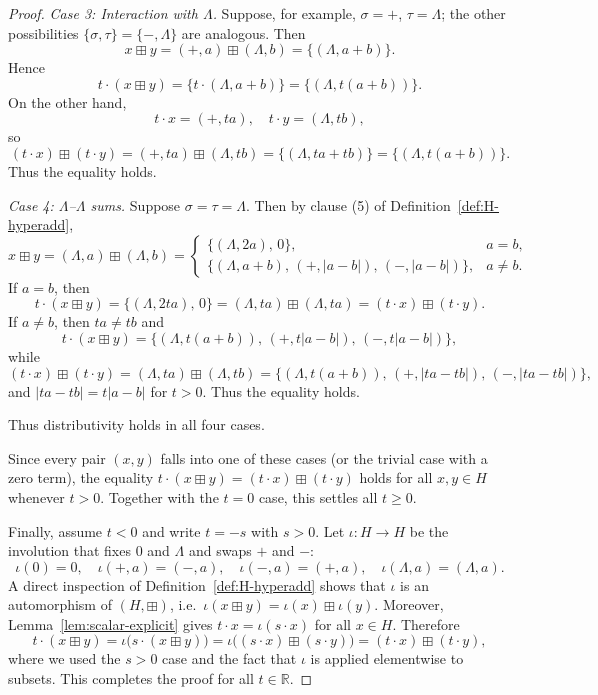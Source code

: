 \documentclass[11pt]{amsart}
\numberwithin{equation}{section}
\theoremstyle{definition}
\theoremstyle{remark}
\newcommand{\R}{\mathbb{R}}
\newcommand{\Hnum}{H}                      %
\newcommand{\op}{\boxplus}                 %
\begin{document}
\begin{proof}
\smallskip\noindent
\emph{Case 3: Interaction with $\Lambda$.}  Suppose, for example,
$\sigma=+$, $\tau=\Lambda$; the other possibilities
$\{\sigma,\tau\}=\{-,\Lambda\}$ are analogous.  Then
\[
  x\op y
  = (+,a)\op(\Lambda,b)
  = \{(\Lambda,a+b)\}.
\]
Hence
\[
  t\cdot(x\op y)
  = \{t\cdot(\Lambda,a+b)\}
  = \{(\Lambda,t(a+b))\}.
\]
On the other hand,
\[
  t\cdot x = (+,ta),\quad
  t\cdot y = (\Lambda,tb),
\]
so
\[
  (t\cdot x)\op(t\cdot y)
  = (+,ta)\op(\Lambda,tb)
  = \{(\Lambda,ta+tb)\}
  = \{(\Lambda,t(a+b))\}.
\]
Thus the equality holds.

\smallskip\noindent
\smallskip\noindent
\emph{Case 4: $\Lambda$--$\Lambda$ sums.}  Suppose $\sigma=\tau=\Lambda$.
Then by clause (5) of Definition~\ref{def:H-hyperadd},
\[
  x\op y
  = (\Lambda,a)\op(\Lambda,b)
  =
  \begin{cases}
    \{(\Lambda,2a),\,0\}, & a=b,\\[2pt]
    \{(\Lambda,a+b),\, (+,|a-b|),\, (-,|a-b|)\}, & a\ne b.
  \end{cases}
\]
If $a=b$, then
\[
  t\cdot(x\op y)
  = \{(\Lambda,2ta),\,0\}
  = (\Lambda,ta)\op(\Lambda,ta)
  = (t\cdot x)\op(t\cdot y).
\]
If $a\ne b$, then $ta\ne tb$ and
\[
  t\cdot(x\op y)
  = \{(\Lambda,t(a+b)),\, (+,t|a-b|),\, (-,t|a-b|)\},
\]
while
\[
  (t\cdot x)\op(t\cdot y)
  = (\Lambda,ta)\op(\Lambda,tb)
  = \{(\Lambda,t(a+b)),\, (+,|ta-tb|),\, (-,|ta-tb|)\},
\]
and $|ta-tb|=t|a-b|$ for $t>0$.  Thus the equality holds.

Thus distributivity holds in all four cases.

Since every pair $(x,y)$ falls into one of these cases (or the trivial
case with a zero term), the equality
$t\cdot(x\op y)=(t\cdot x)\op(t\cdot y)$ holds for all $x,y\in\Hnum$
whenever $t>0$.  Together with the $t=0$ case, this settles all $t\ge0$.

Finally, assume $t<0$ and write $t=-s$ with $s>0$.  Let
$\iota:\Hnum\to\Hnum$ be the involution that fixes $0$ and $\Lambda$ and
swaps $+$ and $-$:
\[
  \iota(0)=0,\quad \iota(+,a)=(-,a),\quad \iota(-,a)=(+,a),\quad \iota(\Lambda,a)=(\Lambda,a).
\]
A direct inspection of Definition~\ref{def:H-hyperadd} shows that $\iota$
is an automorphism of $(\Hnum,\op)$, i.e.\ $\iota(x\op y)=\iota(x)\op\iota(y)$.
Moreover, Lemma~\ref{lem:scalar-explicit} gives $t\cdot x=\iota(s\cdot x)$ for all
$x\in\Hnum$.  Therefore
\[
  t\cdot(x\op y)=\iota\bigl(s\cdot(x\op y)\bigr)
  =\iota\bigl((s\cdot x)\op(s\cdot y)\bigr)
  =(t\cdot x)\op(t\cdot y),
\]
where we used the $s>0$ case and the fact that $\iota$ is applied elementwise
to subsets.  This completes the proof for all $t\in\R$.
\end{proof}
\end{document}
